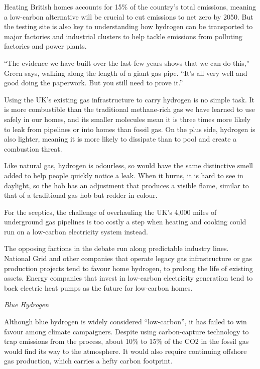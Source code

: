 \documentclass[
]{book}
\begin{document}
Heating British homes accounts for 15\% of the country's total emissions, meaning a low-carbon alternative will be crucial to cut emissions to net zero by 2050. But the testing site is also key to understanding how hydrogen can be transported to major factories and industrial clusters to help tackle emissions from polluting factories and power plants.

``The evidence we have built over the last few years shows that we can do this,'' Green says, walking along the length of a giant gas pipe. ``It's all very well and good doing the paperwork. But you still need to prove it.''

Using the UK's existing gas infrastructure to carry hydrogen is no simple task. It is more combustible than the traditional methane-rich gas we have learned to use safely in our homes, and its smaller molecules mean it is three times more likely to leak from pipelines or into homes than fossil gas. On the plus side, hydrogen is also lighter, meaning it is more likely to dissipate than to pool and create a combustion threat.

Like natural gas, hydrogen is odourless, so would have the same distinctive smell added to help people quickly notice a leak. When it burns, it is hard to see in daylight, so the hob has an adjustment that produces a visible flame, similar to that of a traditional gas hob but redder in colour.

For the sceptics, the challenge of overhauling the UK's 4,000 miles of underground gas pipelines is too costly a step when heating and cooking could run on a low-carbon electricity system instead.

The opposing factions in the debate run along predictable industry lines. National Grid and other companies that operate legacy gas infrastructure or gas production projects tend to favour home hydrogen, to prolong the life of existing assets. Energy companies that invest in low-carbon electricity generation tend to back electric heat pumps as the future for low-carbon homes.

\emph{Blue Hydrogen}

Although blue hydrogen is widely considered ``low-carbon'', it has failed to win favour among climate campaigners. Despite using carbon-capture technology to trap emissions from the process, about 10\% to 15\% of the CO2 in the fossil gas would find its way to the atmosphere. It would also require continuing offshore gas production, which carries a hefty carbon footprint.
\end{document}
